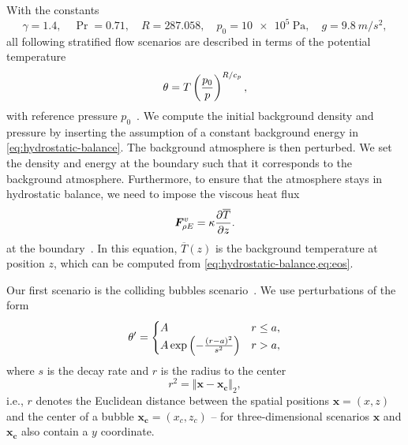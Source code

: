 \documentclass[runningheads]{llncs}
\begin{document}
With  the constants
\begin{equation}\label{eq:atmosphere-constants}
    \gamma = 1.4 ,\quad \Pr =  0.71 ,\quad R = 287.058 ,\quad p_0 = \SI{10e5}{\Pa}, \quad g = \SI{9.8}{m/s^2},
\end{equation}
all following stratified flow scenarios are described in terms of the potential temperature
\begin{equation}
  \theta = T \left( \frac{p_0}{p} \right)^{R/c_p},
\end{equation}
with reference pressure $p_0$~\cite{muller2010adaptive,giraldo2008study}.
%
We compute the initial background density and pressure by inserting the assumption of a constant background energy in \cref{eq:hydrostatic-balance}.
The background atmosphere is then perturbed.
We set the density and energy at the boundary such that it corresponds to the background atmosphere.
Furthermore, to ensure that the atmosphere stays in hydrostatic balance, we need to impose the viscous heat flux
\begin{equation}
  \label{eq:atmosphere-bc}
  \viscFlux_{\QE} = \kappa \pdv{\overline{T}}{z}.%
\end{equation}
at the boundary~\cite{giraldo2008study}.
In this equation, $\overline{T}(z)$ is the background temperature at position $z$, which can be computed from \cref{eq:hydrostatic-balance,eq:eos}.

Our first scenario is the colliding bubbles scenario~\cite{muller2010adaptive}.
We use perturbations of the form
\begin{equation}
  \label{eq:bubbles-pertubation}
  \theta' =
  \begin{cases}
    A & r \leq a, \\
    A \exp \left( - \frac{(r-a)^2}{s^2} \right) & r > a,
    \end{cases}
\end{equation}
where $s$ is the decay rate and $r$  is the radius to the center
\begin{equation}
  \label{eq:radius}
  r^2 = \Vert \bm{x} - \bm{x_c} \Vert_2,
\end{equation}
i.e., $r$ denotes the Euclidean distance between the spatial positions $\bm{x} = (x, z)$ and the center of a bubble $\bm{x_c} = (x_c, z_c)$ -- for three-dimensional scenarios $\bm{x}$ and $\bm{x_c}$ also contain a $y$ coordinate.
\end{document}
